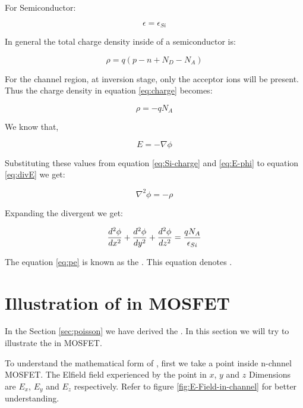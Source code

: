\documentclass[a4paper]{article}
\begin{document}
For Semiconductor:

\begin{equation}
  \epsilon = \epsilon_{Si}
\end{equation}

In general the total charge density inside of a semiconductor is:

\begin{equation}
  \label{eq:charge}
  \rho = q(p - n + N_D - N_A)
\end{equation}

For the channel region, at inversion stage, only the acceptor ions will be present. Thus the charge density in equation \ref{eq:charge} becomes:

\begin{equation}
  \label{eq:Si-charge}
  \rho = - qN_A
\end{equation}

We know that,

\begin{equation}
  \label{eq:E-phi}
  E = - \nabla \mathcal{\phi}
\end{equation}

Substituting these values from equation \ref{eq:Si-charge} and \ref{eq:E-phi} to equation \ref{eq:divE} we get:

\begin{equation}
  \nabla^2 \phi = - \rho
\end{equation}

Expanding the divergent we get:

\begin{equation}
  \label{eq:pe}
  \frac {d^2\phi} {dx^2} + \frac {d^2\phi} {dy^2} + \frac {d^2\phi} {dz^2} = \frac{qN_A} {\epsilon_{Si}}
\end{equation}

The equation \ref{eq:pe} is known as the \PE. This equation denotes \PEstate.

\section{Illustration of \PE in MOSFET}
\label{sec:Poisson-in-MOS}
In the Section \ref{sec:poisson} we have derived the \PE. In this section we will try to illustrate the \PE in MOSFET.

To understand the mathematical form of \PE, first we take a point inside n-chnnel MOSFET. The Elfield field experienced by the point in $x$, $y$ and $z$ Dimensions are $E_x$, $E_y$ and $E_z$ respectively. Refer to figure \ref{fig:E-Field-in-channel} for better understanding.
\end{document}
